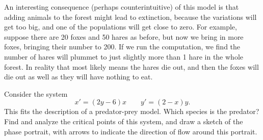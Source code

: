 An interesting consequence (perhaps counterintuitive) of this model is that adding animals to
the forest might lead to extinction, because the variations will get too
big, and one of the populations will get close to zero.  For example, suppose there are 20 foxes and 50 hares as
before, but now we bring in more foxes, bringing their number to 200.  If we
run the computation, we find the number of hares will plummet to just
slightly more than 1 hare in the whole forest.  In reality that most
likely means the hares die out, and then the foxes will die out as well
as they will have nothing to eat.

\begin{example} \label{example:PredPreyNC}
Consider the system
\begin{equation*}
x' = (2y - 6)x \qquad y' = (2 - x)y.
\end{equation*}
This fits the description of a predator-prey model. Which species is the predator? Find and analyze the critical points of this system, and draw a sketch of the phase portrait, with arrows to indicate the direction of flow around this portrait.
\end{example}

